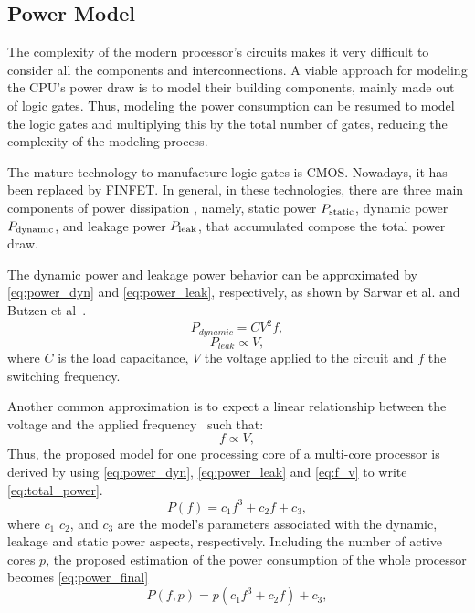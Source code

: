 \subsection{Power Model} \label{sec:powermodel}
The complexity of the modern processor's circuits makes it very difficult to consider all the components and interconnections. A viable approach for modeling the CPU's power draw is to model their building components, mainly made out of logic gates. Thus, modeling the power consumption can be resumed to model the logic gates and multiplying this by the total number of gates, reducing the complexity of the modeling process.

The mature technology to manufacture logic gates is CMOS. Nowadays, it has been replaced by FINFET. In general, in these technologies, there are three main components of power dissipation \cite{Rauber2014, Goel2016, Du2017, Gonzalez1997},  namely, static power $P_{\rm static}$, dynamic power $P_{\rm dynamic}$, and leakage power $P_{\rm leak}$, that accumulated compose the total power draw.

The dynamic power and leakage power behavior can be approximated by \cref{eq:power_dyn} and \cref{eq:power_leak}, respectively, as shown by Sarwar et al. and Butzen et al~\cite{Sarwar1997, Butzen2007}.
\begin{equation}
P_{dynamic}=CV^2f,
\label{eq:power_dyn}
\end{equation}
\begin{equation}
P_{leak} \propto V,
\label{eq:power_leak}
\end{equation}
where $C$ is the load capacitance, $V$ the voltage applied to the circuit and $f$ the switching frequency.

Another common approximation is to expect a linear relationship between the voltage and the applied frequency~\cite{Usman2013ANoC} such that:
\begin{equation}
f \propto V,
\label{eq:f_v}
\end{equation}
Thus, the proposed model for one processing core of a multi-core processor is derived by using \cref{eq:power_dyn}, \cref{eq:power_leak} and \cref{eq:f_v} to write \cref{eq:total_power}.
\begin{equation}
P(f)= c_1f^3+c_2f+c_3,
\label{eq:total_power}
\end{equation}
where $c_1$ $c_2$, and $c_3$ are the model's parameters associated with the dynamic, leakage and static power aspects, respectively. Including the number of active cores $p$, the proposed estimation of the power consumption of the whole processor becomes \cref{eq:power_final}
\begin{equation}
P(f,p)= p(c_1f^3+c_2f)+c_3,
\label{eq:power_final}
\end{equation}

